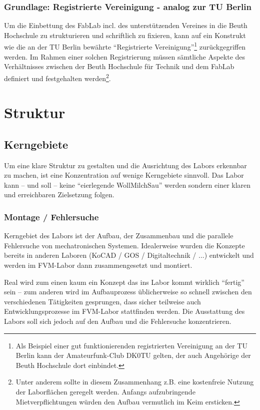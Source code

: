 \documentclass[parskip=half,headsepline,footsepline,titlepage]{scrartcl}
\begin{document}
\subsubsection{Grundlage: Registrierte Vereinigung - analog zur TU Berlin}
Um die Einbettung des FabLab incl. des unterstützenden Vereines in die Beuth Hochschule zu strukturieren und schriftlich zu fixieren, kann auf ein Konstrukt wie die an der TU Berlin bewährte ``Registrierte Vereinigung''\footnote{Als Beispiel einer gut funktionierenden registrierten Vereinigung an der TU Berlin kann der Amateurfunk-Club DK0TU gelten, der auch Angehörige der Beuth Hochschule dort einbindet.} zurückgegriffen werden.
Im Rahmen einer solchen Registrierung müssen sämtliche Aspekte des Verhältnisses zwischen der Beuth Hochschule für Technik und dem FabLab definiert und festgehalten werden\footnote{Unter anderem sollte in diesem Zusammenhang z.B. eine kostenfreie Nutzung der Laborflächen geregelt werden. Anfangs aufzubringende Mietverpflichtungen würden den Aufbau vermutlich im Keim ersticken.}.


\section{Struktur}

\subsection{Kerngebiete}
Um eine klare Struktur zu gestalten und die Ausrichtung des Labors erkennbar zu machen, ist eine Konzentration auf wenige Kerngebiete sinnvoll. Das Labor kann -- und soll -- keine ``eierlegende WollMilchSau'' werden sondern einer klaren und erreichbaren Zielsetzung folgen.

\subsubsection{Montage / Fehlersuche}
Kerngebiet des Labors ist der Aufbau, der Zusammenbau und die parallele Fehlersuche von mechatronischen Systemen. Idealerweise wurden die Konzepte bereits in anderen Laboren (KoCAD / GOS / Digitaltechnik / ...) entwickelt und werden im FVM-Labor dann zusammengesetzt und montiert. 

Real wird zum einen kaum ein Konzept das ins Labor kommt wirklich ``fertig'' sein -- zum anderen wird im Aufbauprozess üblicherweise so schnell zwischen den verschiedenen Tätigkeiten gesprungen, dass sicher teilweise auch Entwicklungsprozesse im FVM-Labor stattfinden werden. Die Ausstattung des Labors soll sich jedoch auf den Aufbau und die Fehlersuche konzentrieren.
\end{document}
